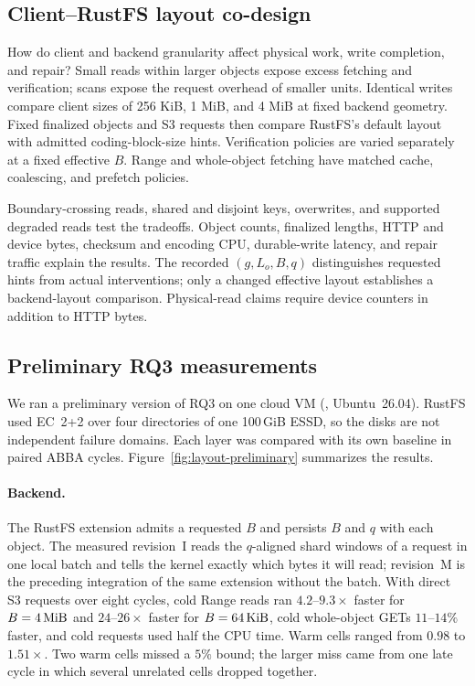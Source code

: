 \subsection{Client--RustFS layout co-design}

 How do client and backend granularity affect physical
work, write completion, and repair?
Small reads within larger objects expose excess fetching and
verification; scans expose the request overhead of smaller units.
Identical writes compare client sizes of 256 KiB, 1 MiB, and 4 MiB at
fixed backend geometry. Fixed finalized objects and S3 requests then
compare RustFS's default layout with admitted coding-block-size hints.
Verification policies are varied separately at a fixed effective $B$.
Range and whole-object fetching have matched cache, coalescing, and
prefetch policies.

Boundary-crossing reads, shared and disjoint keys, overwrites, and
supported degraded reads test the tradeoffs. Object counts, finalized
lengths, HTTP and device bytes, checksum and encoding CPU, durable-write
latency, and repair traffic explain the results. The recorded
$(g,L_o,B,q)$ distinguishes requested hints from actual interventions;
only a changed effective layout establishes a backend-layout comparison.
Physical-read claims require device counters in addition to HTTP bytes.

\subsection{Preliminary RQ3 measurements}
\label{sec:layout-preliminary}

We ran a preliminary version of RQ3 on one cloud VM
(, Ubuntu~26.04). RustFS used EC~2+2 over four
directories of one 100\,GiB ESSD, so the disks are not independent failure
domains. Each layer was compared with its own baseline in paired ABBA
cycles. Figure~\ref{fig:layout-preliminary} summarizes the results.

\paragraph{Backend.} The RustFS extension admits a requested $B$ and
persists $B$ and $q$ with each object. The measured revision~I reads the
$q$-aligned shard windows of a request in one local batch and tells the
kernel exactly which bytes it will read; revision~M is the preceding
integration of the same extension without the batch. With direct S3
requests over eight cycles, cold Range reads ran $4.2$--$9.3\times$ faster
for $B=4\,\mathrm{MiB}$ and $24$--$26\times$ faster for $B=64\,\mathrm{KiB}$, cold whole-object
GETs $11$--$14\%$ faster, and cold requests used half the CPU time. Warm
cells ranged from $0.98$ to $1.51\times$. Two warm cells missed a $5\%$
bound; the larger miss came from one late cycle in which several
unrelated cells dropped together.

